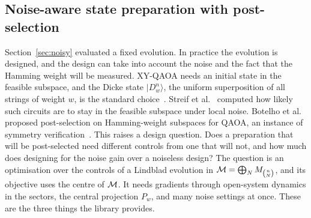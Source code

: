 \providecommand{\NCSegments}{4}\providecommand{\NCSettings}{12}\providecommand{\NCSteps}{--}\providecommand{\NCStepsZero}{--}\providecommand{\NCSubsteps}{2}
\providecommand{\NCStarts}{--}\providecommand{\NCWarm}{--}\providecommand{\NCWarmLarge}{--}\providecommand{\NCLambda}{0.05}\providecommand{\NCEvalSubsteps}{20}\providecommand{\NCnMax}{6}
\providecommand{\NCRows}{\multicolumn{9}{c}{\emph{run scripts/noisy\_xy\_control.py}}\\}
\subsection{Noise-aware state preparation with post-selection}\label{sec:control}

Section~\ref{sec:noisy} evaluated a fixed evolution. In practice the evolution is designed, and the design can take
into account the noise and the fact that the Hamming weight will be measured. XY-QAOA needs an initial state in the
feasible subspace, and the Dicke state $|D^n_w\rangle$, the uniform superposition of all strings of weight $w$, is the
standard choice~\cite{hadfield2019,wang2020}. Streif et al.~\cite{streif2021} computed how likely such circuits are
to stay in the feasible subspace under local noise. Botelho et al.~\cite{botelho2022} proposed post-selection on
Hamming-weight subspaces for QAOA, an instance of symmetry verification~\cite{cai2023}. This raises a design question. Does a preparation that will be
post-selected need different controls from one that will not, and how much does designing for the noise gain over
a noiseless design? The question is an optimisation over the controls of a Lindblad evolution in
$\mathcal{M}=\bigoplus_NM_{\binom nN}$, and its objective uses the centre of $\mathcal{M}$. It needs gradients through open-system
dynamics in the sectors, the central projection $P_w$, and many noise settings at once. These are the three things the
library provides.

